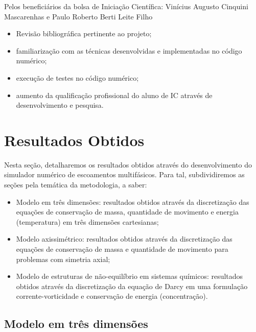 \documentclass[a4paper,portuges,12pt]{article}
\begin{document}
Pelos beneficiários da bolsa de Iniciação Científica: Vinícius Augusto
Cinquini Mascarenhas e Paulo Roberto Berti Leite Filho

\begin{itemize}
	\item Revisão bibliográfica pertinente ao projeto;
	\item familiarização com as técnicas desenvolvidas e implementadas no
	código numérico;
	\item execução de testes no código numérico;
	\item aumento da qualificação profissional do aluno de IC através de
	desenvolvimento e pesquisa.
\end{itemize}

\section{Resultados Obtidos}

Nesta seção, detalharemos os resultados obtidos através do
desenvolvimento do simulador numérico de escoamentos multifásicos. Para
tal, subdividiremos as seções pela temática da metodologia, a saber: 
 
\begin{itemize}
	\item Modelo em três dimensões: resultados obtidos através da
	discretização das equações de conservação de massa, quantidade de
	movimento e energia (temperatura) em três dimensões cartesianas;
	\item Modelo axissimétrico: resultados obtidos através da
	discretização das equações de conservação de massa e quantidade de
	movimento para problemas com simetria axial;
	\item Modelo de estruturas de não-equilíbrio em sistemas químicos:
	resultados obtidos através da discretização da equação de Darcy em
	uma formulação corrente-vorticidade e conservação de energia
	(concentração).
\end{itemize}

\subsection{Modelo em três dimensões}
\end{document}
